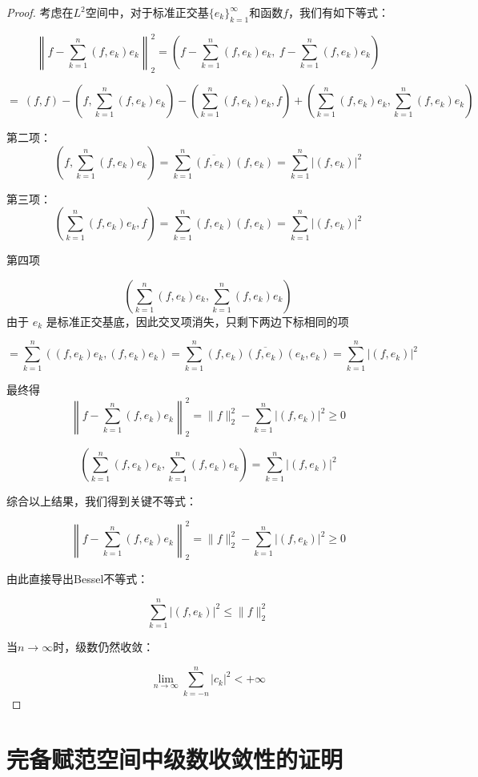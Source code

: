 \documentclass[12pt,a4paper]{article}
\numberwithin{subsection}{section}   %
\numberwithin{subsubsection}{subsection}
\theoremstyle{plain}
\theoremstyle{definition}
\theoremstyle{remark}
\theoremstyle{remark}
\begin{document}
\begin{proof}
	考虑在$L^2$空间中，对于标准正交基$\{e_k\}_{k=1}^\infty$和函数$f$，我们有如下等式：
	
	\[
	\left\| f - \sum_{k=1}^n (f, e_k) e_k \right\|_2^2 = \left( f - \sum_{k=1}^n (f, e_k) e_k,\ f - \sum_{k=1}^n (f, e_k) e_k \right)
	\]

	\[
		= \ (f, f) - \left( f, \sum_{k=1}^n (f, e_k) e_k \right) - \left( \sum_{k=1}^n (f, e_k) e_k, f \right) + \left( \sum_{k=1}^n (f, e_k) e_k, \sum_{k=1}^n (f, e_k) e_k \right)
	\]

	 第二项：
	 \[
	 \left( f, \sum_{k=1}^n (f, e_k) e_k \right) = \sum_{k=1}^n \overline{(f, e_k)} (f, e_k) = \sum_{k=1}^n |(f, e_k)|^2
	 \]
	 
	 第三项：
	 \[
	 \left( \sum_{k=1}^n (f, e_k) e_k, f \right)  = \sum_{k=1}^n (f, e_k) {(f, e_k)} = \sum_{k=1}^n |(f, e_k)|^2
	 \]
		
第四项

\[
\left( \sum_{k=1}^n (f, e_k) e_k, \sum_{k=1}^n (f, e_k) e_k \right)
\]
由于 \(e_k\) 是标准正交基底，因此交叉项消失，只剩下两边下标相同的项

\[
= \sum_{k=1}^n \left( (f, e_k) e_k, (f, e_k) e_k \right) = \sum_{k=1}^n (f, e_k) \overline{(f, e_k)} (e_k, e_k) = \sum_{k=1}^n |(f, e_k)|^2
\]

最终得
\[
\left\| f - \sum_{k=1}^n (f, e_k) e_k \right\|_2^2 = \|f\|_2^2 - \sum_{k=1}^n |(f, e_k)|^2 \geq 0
\]

		\[
		\left( \sum_{k=1}^n (f, e_k) e_k, \sum_{k=1}^n (f, e_k) e_k \right) = \sum_{k=1}^n |(f, e_k)|^2
		\]

	
	综合以上结果，我们得到关键不等式：
	
	\[
	\left\| f - \sum_{k=1}^n (f, e_k) e_k \right\|_2^2 = \|f\|_2^2 - \sum_{k=1}^n |(f, e_k)|^2 \geq 0
	\]
	
	由此直接导出Bessel不等式：
	
	\[
	\sum_{k=1}^n |(f, e_k)|^2 \leq \|f\|_2^2
	\]
	
	当$n \to \infty$时，级数仍然收敛：
	
	\[
	\lim_{n \to \infty} \sum_{k=-n}^n |c_k|^2 < +\infty
	\]
	
\end{proof}
	
	\section{完备赋范空间中级数收敛性的证明}
	
\end{document}
